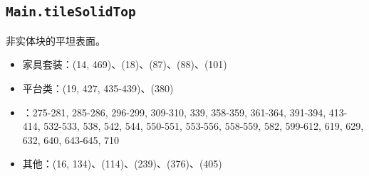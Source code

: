 \subsection{\texttt{Main.tileSolidTop}}\label{src:tileSolidTop}
非实体块的平坦表面。
\begin{itemize}
  \item 家具套装：(14, 469)、(18)、(87)、(88)、(101)
  \item 平台类：(19, 427, 435-439)、(380)
  \item {}：275-281, 285-286, 296-299, 309-310, 339, 358-359, 361-364, 391-394, 413-414, 532-533, 538, 542, 544, 550-551, 553-556, 558-559, 582, 599-612, 619, 629, 632, 640, 643-645, 710
  \item 其他：(16, 134)、(114)、(239)、(376)、(405)
\end{itemize}
